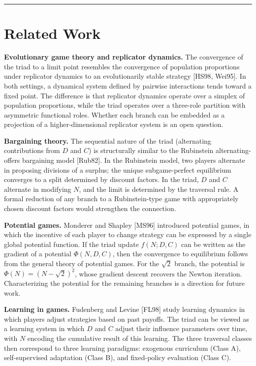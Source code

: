 \documentclass[12pt]{article}
\begin{document}
\begin{center}\rule{0.5\linewidth}{0.5pt}\end{center}

\section{Related Work}\label{related-work}

\textbf{Evolutionary game theory and replicator dynamics.} The
convergence of the triad to a limit point resembles the convergence of
population proportions under replicator dynamics to an evolutionarily
stable strategy {[}HS98, Wei95{]}. In both settings, a dynamical system
defined by pairwise interactions tends toward a fixed point. The
difference is that replicator dynamics operate over a simplex of
population proportions, while the triad operates over a three-role
partition with asymmetric functional roles. Whether each branch can be
embedded as a projection of a higher-dimensional replicator system is an
open question.

\textbf{Bargaining theory.} The sequential nature of the triad
(alternating contributions from \(D\) and \(C\)) is structurally similar
to the Rubinstein alternating-offers bargaining model {[}Rub82{]}. In
the Rubinstein model, two players alternate in proposing divisions of a
surplus; the unique subgame-perfect equilibrium converges to a split
determined by discount factors. In the triad, \(D\) and \(C\) alternate
in modifying \(N\), and the limit is determined by the traversal rule. A
formal reduction of any branch to a Rubinstein-type game with
appropriately chosen discount factors would strengthen the connection.

\textbf{Potential games.} Monderer and Shapley {[}MS96{]} introduced
potential games, in which the incentive of each player to change
strategy can be expressed by a single global potential function. If the
triad update \(f(N; D, C)\) can be written as the gradient of a
potential \(\Phi(N, D, C)\), then the convergence to equilibrium follows
from the general theory of potential games. For the \(\sqrt{2}\) branch,
the potential is \(\Phi(N) = (N - \sqrt{2})^2\), whose gradient descent
recovers the Newton iteration. Characterizing the potential for the
remaining branches is a direction for future work.

\textbf{Learning in games.} Fudenberg and Levine {[}FL98{]} study
learning dynamics in which players adjust strategies based on past
payoffs. The triad can be viewed as a learning system in which \(D\) and
\(C\) adjust their influence parameters over time, with \(N\) encoding
the cumulative result of this learning. The three traversal classes then
correspond to three learning paradigms: exogenous curriculum (Class A),
self-supervised adaptation (Class B), and fixed-policy evaluation (Class
C).
\end{document}
